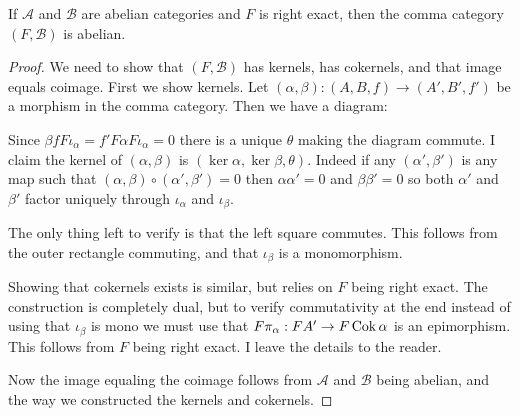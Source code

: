 \begin{prop}\label{prop:comma-cat_abelian}
	If $\mathcal A$ and $\mathcal B$ are abelian categories and $F$ is right exact, then the comma category $(F, \mathcal  B)$ is abelian.
	\begin{proof}
		We need to show that $(F, \mathcal B)$ has kernels, has cokernels, and that image equals coimage. First we show kernels. Let $(\alpha, \beta):(A, B, f) \to (A', B', f')$ be a morphism in the comma category. Then we have a diagram:
		\begin{center}
		\end{center}
		Since $\beta f F\iota_\alpha = f' F\alpha F \iota_\alpha = 0$ there is a unique $\theta$ making the diagram commute. I claim the kernel of $(\alpha, \beta)$ is $(\ker \alpha, \ker \beta, \theta)$. Indeed if any $(\alpha', \beta')$ is any map such that $(\alpha, \beta) \circ (\alpha', \beta') = 0$ then $\alpha\alpha'=0$ and $\beta\beta'=0$ so both $\alpha'$ and $\beta'$ factor uniquely through $\iota_\alpha$ and $\iota_\beta$.
		\begin{center}
		\end{center}
		The only thing left to verify is that the left square commutes. This follows from the outer rectangle commuting, and that $\iota_\beta$ is a monomorphism.
		
		Showing that cokernels exists is similar, but relies on $F$ being right exact. The construction is completely dual, but to verify commutativity at the end instead of using that $\iota_\beta$ is mono we must use that $F\pi_\alpha: FA' \to F\operatorname{Cok} \alpha$ is an epimorphism. This follows from $F$ being right exact. I leave the details to the reader. 
		
		Now the image equaling the coimage follows from $\mathcal A$ and $\mathcal B$ being abelian, and the way we constructed the kernels and cokernels.
	\end{proof}
\end{prop}

